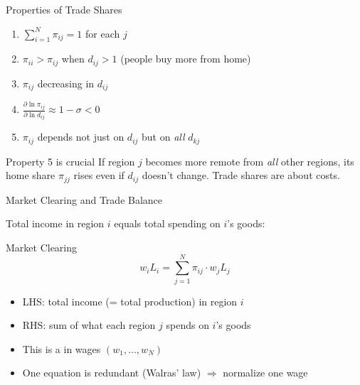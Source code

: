 \documentclass{beamer}
\begin{document}
\begin{frame}{Properties of Trade Shares}

    \begin{enumerate}
        \item {} $\sum_{i=1}^{N} \pi_{ij} = 1$ for each $j$
        \item {} $\pi_{ii} > \pi_{ij}$ when $d_{ij} > 1$ (people buy more from home)
        \item {} $\pi_{ij}$ decreasing in $d_{ij}$
        \item {} $\frac{\partial \ln \pi_{ij}}{\partial \ln d_{ij}} \approx 1 - \sigma < 0$
        \item {} $\pi_{ij}$ depends not just on $d_{ij}$ but on \emph{all} $d_{kj}$
    \end{enumerate}

    \vspace{0.5em}
    \begin{exampleblock}{Property 5 is crucial}
        If region $j$ becomes more remote from \emph{all} other regions, its home share $\pi_{jj}$ rises even if $d_{ij}$ doesn't change. Trade shares are about  costs.
    \end{exampleblock}

\end{frame}

\begin{frame}{Market Clearing and Trade Balance}

    Total income in region $i$ equals total spending on $i$'s goods:

    \vspace{0.3em}
    \begin{block}{Market Clearing}
        \vspace{-0.5em}
        \[ w_i L_i = \sum_{j=1}^{N} \pi_{ij} \cdot w_j L_j \]
    \end{block}

    \vspace{0.3em}
    \begin{itemize}
        \item LHS: total income (= total production) in region $i$
        \item RHS: sum of what each region $j$ spends on $i$'s goods
        \item This is a  in wages $(w_1, \ldots, w_N)$
        \item One equation is redundant (Walras' law) $\Rightarrow$ normalize one wage
    \end{itemize}

    \vspace{0.3em}

\end{frame}
\end{document}
